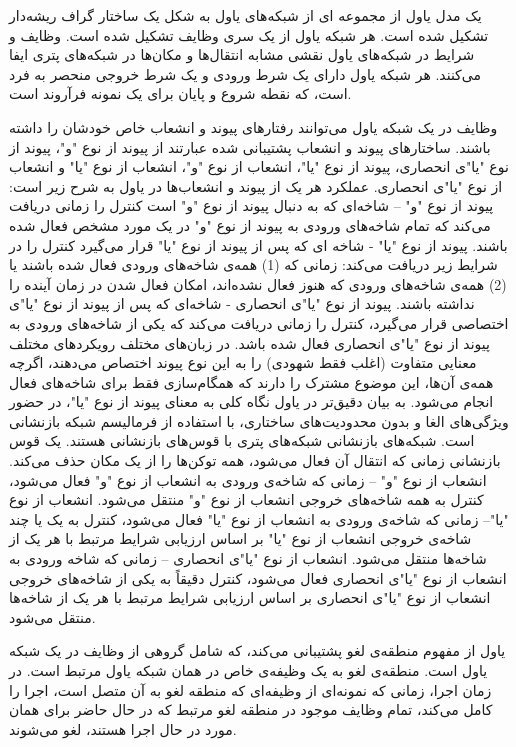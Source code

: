 یک مدل یاول از مجموعه ای از شبکه‌های یاول به شکل یک ساختار گراف ریشه‌دار تشکیل شده است. هر شبکه یاول از یک سری وظایف تشکیل شده است. وظایف و شرایط در شبکه‌های یاول نقشی مشابه انتقال‌ها و مکان‌ها در شبکه‌های پتری ایفا می‌کنند. هر شبکه یاول دارای یک شرط ورودی و یک شرط خروجی منحصر به فرد است، که نقطه شروع و پایان برای یک نمونه فرآروند است.

وظایف در یک شبکه یاول می‌توانند رفتارهای پیوند و انشعاب خاص خودشان را داشته باشند. ساختارهای پیوند و انشعاب پشتیبانی شده عبارتند از پیوند از نوع "و"، پیوند از نوع "یا"ی انحصاری، پیوند از نوع "یا"، انشعاب از نوع "و"، انشعاب از نوع "یا" و انشعاب از نوع "یا"ی انحصاری. عملکرد هر یک از پیوند و انشعاب‌ها در یاول به شرح زیر است:
 پیوند از نوع "و" – شاخه‌ای که به دنبال پیوند از نوع "و" است کنترل را زمانی دریافت می‌کند که تمام شاخه‌های ورودی به پیوند از نوع "و" در یک مورد مشخص فعال شده باشند.
 پیوند از نوع "یا" - شاخه ای که پس از پیوند از نوع "یا" قرار می‌گیرد کنترل را در شرایط زیر دریافت می‌کند: زمانی که (1) همه‌ی شاخه‌های ورودی فعال شده باشند یا (2) همه‌ی شاخه‌های ورودی‌ که هنوز فعال نشده‌اند، امکان فعال شدن در زمان آینده را نداشته باشند.
 پیوند از نوع "یا"ی انحصاری - شاخه‌ای که پس از پیوند از نوع "یا"ی اختصاصی قرار می‌گیرد، کنترل را زمانی دریافت می‌کند که یکی از شاخه‌های ورودی به پیوند از نوع "یا"ی انحصاری فعال شده باشد.
در زبان‌های مختلف رویکردهای مختلف معنایی متفاوت (اغلب فقط شهودی) را به این نوع پیوند اختصاص می‌دهند، اگرچه همه‌‌ی آن‌ها، این موضوع مشترک را دارند که همگام‌سازی فقط برای شاخه‌های فعال انجام می‌شود.
به بیان دقیق‌تر در یاول نگاه کلی به معنای پیوند از نوع "یا"، در حضور ویژگی‌های الغا و بدون محدودیت‌های ساختاری، با استفاده از فرمالیسم شبکه بازنشانی است. شبکه‌های بازنشانی شبکه‌های پتری با قوس‌های بازنشانی هستند. یک قوس بازنشانی زمانی که انتقال آن فعال می‌شود، همه توکن‌ها را از یک مکان حذف می‌کند.
 انشعاب از نوع "و" – زمانی که شاخه‌ی ورودی به انشعاب از نوع "و" فعال می‌شود، کنترل به همه شاخه‌های خروجی انشعاب از نوع "و" منتقل می‌شود.
 انشعاب از نوع "یا"– زمانی که شاخه‌ی ورودی به انشعاب از نوع "یا" فعال می‌شود، کنترل به یک یا چند شاخه‌ی خروجی انشعاب از نوع "یا" بر اساس ارزیابی شرایط مرتبط با هر یک از شاخه‌ها منتقل می‌شود.
 انشعاب از نوع "یا"ی انحصاری – زمانی که شاخه ورودی به انشعاب از نوع "یا"ی انحصاری فعال می‌شود، کنترل دقیقاً به یکی از شاخه‌های خروجی انشعاب از نوع "یا"ی انحصاری بر اساس ارزیابی شرایط مرتبط با هر یک از شاخه‌ها منتقل می‌شود.

یاول از مفهوم منطقه‌ی لغو پشتیبانی می‌کند، که شامل گروهی از وظایف در یک شبکه یاول است. منطقه‌ی لغو به یک وظیفه‌ی خاص در همان شبکه یاول مرتبط است. در زمان اجرا، زمانی که نمونه‌ای از وظیفه‌ای که منطقه لغو به آن متصل است، اجرا را کامل می‌کند، تمام وظایف موجود در منطقه لغو مرتبط که در حال حاضر برای همان مورد در حال اجرا هستند، لغو می‌شوند.

